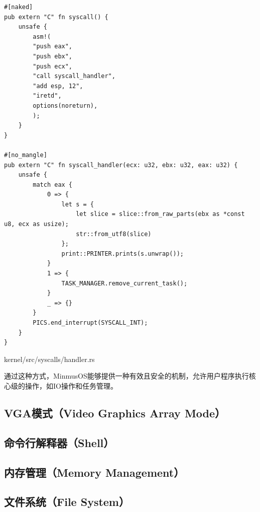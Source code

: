 \begin{listing}[htbp]
    \begin{verbatim}
#[naked]
pub extern "C" fn syscall() {
    unsafe {
        asm!(
        "push eax",
        "push ebx",
        "push ecx",
        "call syscall_handler",
        "add esp, 12",
        "iretd",
        options(noreturn),
        );
    }
}

#[no_mangle]
pub extern "C" fn syscall_handler(ecx: u32, ebx: u32, eax: u32) {
    unsafe {
        match eax {
            0 => {
                let s = {
                    let slice = slice::from_raw_parts(ebx as *const u8, ecx as usize);
                    str::from_utf8(slice)
                };
                print::PRINTER.prints(s.unwrap());
            }
            1 => {
                TASK_MANAGER.remove_current_task();
            }
            _ => {}
        }
        PICS.end_interrupt(SYSCALL_INT);
    }
}
    \end{verbatim}
    \caption{kernel/src/syscalls/handler.rs}\label{lst:HandlerRust}
\end{listing}

通过这种方式，MinmusOS能够提供一种有效且安全的机制，允许用户程序执行核心级的操作，如IO操作和任务管理。

\subsection{VGA模式（Video Graphics Array Mode）}

\subsection{命令行解释器（Shell）}

\subsection{内存管理（Memory Management）}

\subsection{文件系统（File System）}